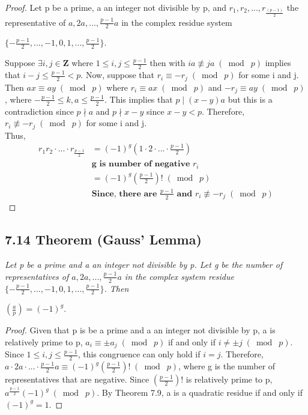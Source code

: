 \documentclass{article}
\begin{document}
\begin{proof}
Let p be a prime, a an integer not divisible by p, and $r_1, r_2,...,r_{\frac{(p-1)}{2}}$ the representative of $a,2a,...,\frac{p-1}{2}a$ in the complex residue system
\begin{center}
    $\{-\frac{p-1}{2},...,-1,0,1,...,\frac{p-1}{2}\}$.
\end{center}
Suppose $\exists i, j \in \mathbf{Z}$ where $1 \leq i, j \leq \frac{p-1}{2}$ then with $ia \not\equiv ja \;(\bmod\; p)$ implies that $i-j \leq \frac{p-1}{2} < p$. Now, suppose that $r_i \equiv -r_j\;(\bmod\; p)$ for some i and j. Then $ax \equiv ay \;(\bmod\; p)$ where $r_i \equiv ax \;(\bmod\; p)$ and $-r_j \equiv ay \;(\bmod\; p)$, where $-\frac{p-1}{2} \leq k,a\leq \frac{p-1}{2}$. This implies that $p \mid (x-y)a$ but this is a contradiction since $p \nmid a$ and $p \nmid x-y$ since $x-y < p$. Therefore, $r_i \not\equiv -r_j\;(\bmod\; p)$ for some i and j.\\
Thus, 
\begin{align*}
    && r_1r_2 \cdot ...\cdot r_{\frac{p-1}{2}} &= (-1)^g (1 \cdot 2 \cdot ... \cdot \frac{p-1}{2})&&\\
    && & \textbf{g is number of negative $r_i$}&&\\
    && &= (-1)^g (\frac{p-1}{2})! \;(\bmod\; p)&&\\
    && & \textbf{Since, there are $\frac{p-1}{2}$ and $r_i \not\equiv -r_j\;(\bmod\; p)$}&&
\end{align*}
\end{proof}

\subsection*{7.14 Theorem (Gauss' Lemma)} 
\quad \textit{Let p be a prime and a an integer not divisible by p. Let g be the number of representatives of $a,2a,...,\frac{p-1}{2}a$ in the complex system residue\\ $\{-\frac{p-1}{2},...,-1,0,1,...,\frac{p-1}{2}\}$. Then}
\begin{center}
    $(\frac{a}{p}) = (-1)^g$.
\end{center}

\begin{proof}
Given that p is be a prime and a an integer not divisible by p, a is relatively prime to p, $a_i \equiv \pm a_j \;(\bmod\; p)$ if and only if $i \neq \pm j \;(\bmod\; p)$. Since $1 \leq i,j \leq \frac{p-1}{2}$, this congruence can only hold if $i = j$. Therefore, $a \cdot 2a \cdot ... \cdot \frac{p-1}{2}a \equiv (-1)^g(\frac{p-1}{2})! \;(\bmod\; p)$, where g is the number of representatives that are negative. Since $(\frac{p-1}{2})!$ is relatively prime to p, $a^{\frac{p-1}{2}} (-1)^g \;(\bmod\; p)$. By Theorem 7.9, a is a quadratic residue if and only if $(-1)^g = 1$.
\end{proof}
\end{document}
